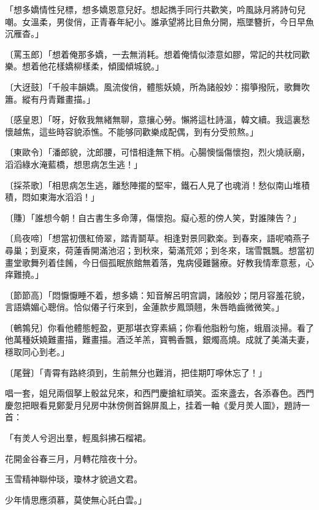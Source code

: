 \begin{myquote}
「想多嬌情性兒標，想多嬌恩意兒好。想起擕手同行共歡笑，吟風詠月將詩句兒嘲。女溫柔，男俊俏，正青春年紀小。誰承望將比目魚分開，瓶墜簪折，今日早魚沉雁杳。」

{\markfont〔罵玉郎〕}「想着俺那多嬌，一去無消耗。想着俺情似漆意如膠，常記的共枕同歡樂。想着他花樣嬌柳樣柔，傾國傾城貌。」

{\markfont〔大迓鼓〕}「千般丰韻嬌。風流俊俏，體態妖嬈，所為諸般妙：搊箏撥阮，歌舞吹簫。縱有丹青難畫描。」

{\markfont〔感皇恩〕}「呀，好敎我無緒無聊，意攘心勞。懶將這杜詩溫，韓文續。我這裏愁懷越焦，這些時容貌添憔。不能够同歡樂成配偶，到有分受煎熬。」

{\markfont〔東歐令〕}「潘郎貌，沈郎腰，可惜相逢無下梢。心腸懊惱傷懷抱，烈火燒祅廟，滔滔綠水淹藍橋，想思病怎生逃！」

{\markfont〔採茶歌〕}「相思病怎生逃，離愁陣擺的堅牢，鐵石人見了也魂消！愁似南山堆積積，悶如東海水滔滔！」

{\markfont〔賺〕}「誰想今朝！自古書生多命薄，傷懷抱。癡心惹的傍人笑，對誰陳告？」

{\markfont〔烏夜啼〕}「想當初偎紅倚翠，踏青鬬草。相逢對景同歡楽。到春來，語呢喃燕子尋巢；到夏來，荷蓮香開滿池沼；到秋來，菊滿荒郊；到冬來，瑞雪飄飄。想當初畫堂歌舞列着佳餚，今日個孤眠旅館無着落，鬼病侵難醫療。好教我情牽意惹，心痒難撓。」

{\markfont〔節節高〕}「悶懨懨睡不着，想多嬌：知音解呂明宫調，諸般妙；閉月容羞花貌，言語嬌媚心聰俏。恰似僊子行來到，金蓮款步鳳頭翹，朱唇皓齒微微笑。」

{\markfont〔鵪鶉兒〕}你看他體態輕盈，更那堪衣穿素縞；你看他脂粉勻施，蛾眉淡掃。看了他萬種妖嬈難畫描，難畫描。酒泛羊羔，寳鴨香飄，銀燭高燒。成就了美滿夫妻，穩取同心到老。」

{\markfont〔尾聲〕}「青霄有路終須到，生前無分也難消，把佳期叮嚀休忘了！」
\end{myquote}

唱一套，姐兒兩個拏上骰盆兒來，和西門慶搶紅頑笑。盃來盞去，各添春色。西門慶忽把眼看見鄭愛月兒房中牀傍側首錦屏風上，挂着一軸《愛月羙人圖》，題詩一首：

\begin{myquote}
「有羙人兮迥出羣，輕風斜拂石榴裙。

花開金谷春三月，月轉花陰夜十分。

玉雪精神聯仲琰，瓊林才貌過文君。

少年情思應須慕，莫使無心託白雲。」

\end{myquote}


